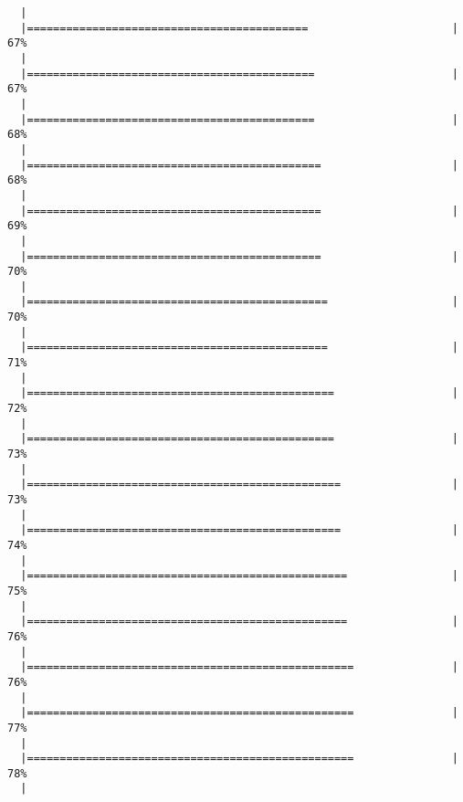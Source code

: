 \begin{knitrout}
\begin{kframe}
\begin{verbatim}
  |                                                                       
  |===========================================                      |  67%
  |                                                                       
  |============================================                     |  67%
  |                                                                       
  |============================================                     |  68%
  |                                                                       
  |=============================================                    |  68%
  |                                                                       
  |=============================================                    |  69%
  |                                                                       
  |=============================================                    |  70%
  |                                                                       
  |==============================================                   |  70%
  |                                                                       
  |==============================================                   |  71%
  |                                                                       
  |===============================================                  |  72%
  |                                                                       
  |===============================================                  |  73%
  |                                                                       
  |================================================                 |  73%
  |                                                                       
  |================================================                 |  74%
  |                                                                       
  |=================================================                |  75%
  |                                                                       
  |=================================================                |  76%
  |                                                                       
  |==================================================               |  76%
  |                                                                       
  |==================================================               |  77%
  |                                                                       
  |==================================================               |  78%
  |                                                                       

\end{verbatim}
\end{kframe}
\end{knitrout}
